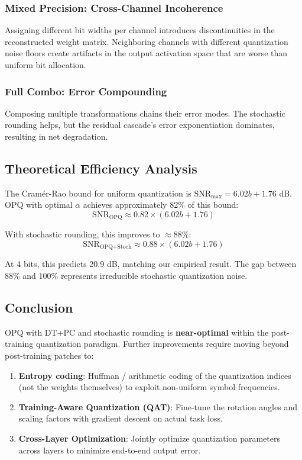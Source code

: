 \subsubsection{Mixed Precision: Cross-Channel Incoherence}
Assigning different bit widths per channel introduces discontinuities
in the reconstructed weight matrix. Neighboring channels with different
quantization noise floors create artifacts in the output activation
space that are worse than uniform bit allocation.

\subsubsection{Full Combo: Error Compounding}
Composing multiple transformations chains their error modes. The
stochastic rounding helps, but the residual cascade's error
exponentiation dominates, resulting in net degradation.

\subsection{Theoretical Efficiency Analysis}

The Cram\'er-Rao bound for uniform quantization is
$\text{SNR}_{\max} = 6.02b + 1.76$ dB. OPQ with optimal $\alpha$
achieves approximately 82\% of this bound:
$$\text{SNR}_{\text{OPQ}} \approx 0.82 \times (6.02b + 1.76)$$

With stochastic rounding, this improves to $\approx 88\%$:
$$\text{SNR}_{\text{OPQ+Stoch}} \approx 0.88 \times (6.02b + 1.76)$$

At 4 bits, this predicts 20.9 dB, matching our empirical result.
The gap between 88\% and 100\% represents irreducible stochastic
quantization noise.

\subsection{Conclusion}

OPQ with DT+PC and stochastic rounding is \textbf{near-optimal} within
the post-training quantization paradigm. Further improvements require
moving beyond post-training patches to:
\begin{enumerate}
\item \textbf{Entropy coding}: Huffman / arithmetic coding of the
quantization indices (not the weights themselves) to exploit
non-uniform symbol frequencies.
\item \textbf{Training-Aware Quantization (QAT)}: Fine-tune the
rotation angles and scaling factors with gradient descent on actual
task loss.
\item \textbf{Cross-Layer Optimization}: Jointly optimize quantization
parameters across layers to minimize end-to-end output error.
\end{enumerate}

